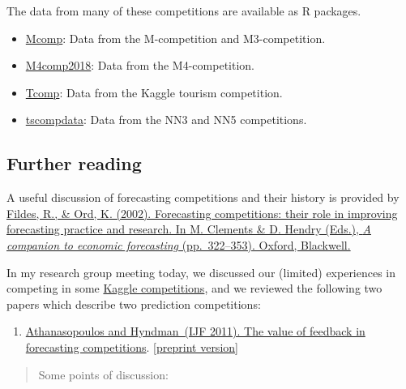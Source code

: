 \documentclass[11pt,a4paper,]{article}
\providecommand{\tightlist}{%
  \setlength{\itemsep}{0pt}\setlength{\parskip}{0pt}}
\begin{document}
The data from many of these competitions are available as R packages.

\begin{itemize}
\tightlist
\item
  \href{http://pkg.robjhyndman.com/Mcomp/}{Mcomp}: Data from the M-competition and M3-competition.
\item
  \href{https://github.com/carlanetto/M4comp2018}{M4comp2018}: Data from the M4-competition.
\item
  \href{https://cran.r-project.org/package=Tcomp}{Tcomp}: Data from the Kaggle tourism competition.
\item
  \href{https://github.com/robjhyndman/tscompdata}{tscompdata}: Data from the NN3 and NN5 competitions.
\end{itemize}

\hypertarget{further-reading}{%
\subsection{Further reading}\label{further-reading}}

A useful discussion of forecasting competitions and their history is provided by \href{https://doi.org/10.1002/9780470996430.ch15}{Fildes, R., \& Ord, K. (2002). Forecasting competitions: their role in improving forecasting practice and research. In M. Clements \& D. Hendry (Eds.), \emph{A companion to economic forecasting} (pp.~322--353). Oxford, Blackwell.}

In my research group meeting today, we discussed our (limited) experiences in competing in some \href{https://www.kaggle.com/competitions}{Kaggle competitions}, and we reviewed the following two papers which describe two prediction competitions:

\begin{enumerate}
\def\labelenumi{\arabic{enumi}.}
\tightlist
\item
  \href{http://dx.doi.org/10.1016/j.ijforecast.2011.03.002}{Athanasopoulos and Hyndman~(IJF 2011). The value of feedback in forecasting competitions}. {[}\href{/papers/kaggle.pdf}{preprint version}{]}
\end{enumerate}

\begin{quote}
Some points of discussion:
\end{quote}
\end{document}
